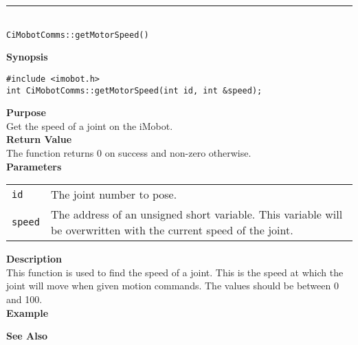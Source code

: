 \noindent
\vspace{5pt}
\rule{4.5in}{0.015in}\\
\noindent
{\LARGE \texttt{CiMobotComms::getMotorSpeed()}}\\
{}

\noindent
{\bf Synopsis}\\
\begin{verbatim}
#include <imobot.h>
int CiMobotComms::getMotorSpeed(int id, int &speed);
\end{verbatim}

\noindent
{\bf Purpose}\\
Get the speed of a joint on the iMobot.\\

\noindent
{\bf Return Value}\\
The function returns 0 on success and non-zero otherwise.\\

\noindent
{\bf Parameters}
\vspace{-0.1in}
\begin{description}
\item               
\begin{tabular}{p{10 mm}p{145 mm}}
\texttt{id} & The joint number to pose. \\
\texttt{speed} & The address of an unsigned short variable. This variable will be overwritten
with the current speed of the joint.
\end{tabular}
\end{description}

\noindent
{\bf Description}\\
This function is used to find the speed of a joint.  This is the speed at which the joint will move when given motion commands. The values should be between 0 and 100. \\

\noindent
{\bf Example}\\
\noindent

\noindent
{\bf See Also}\\

